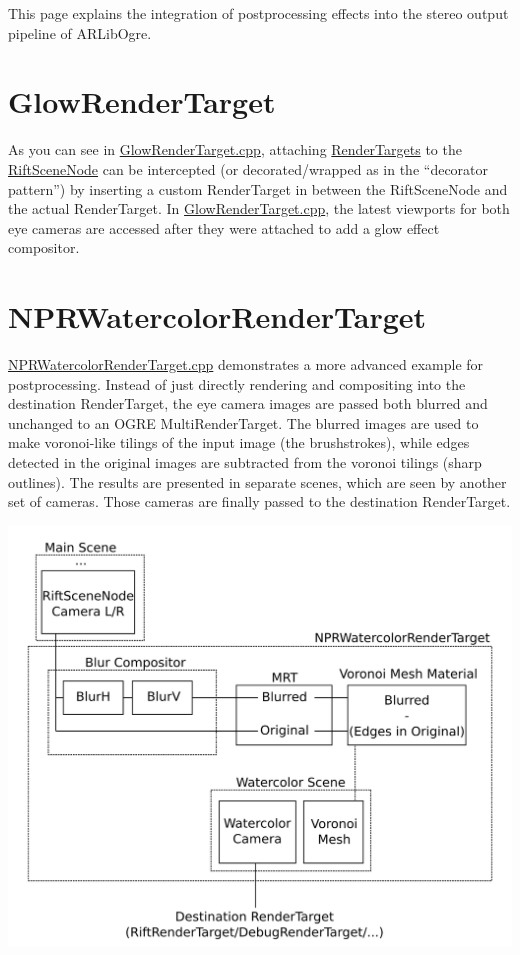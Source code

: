This page explains the integration of postprocessing effects into the stereo output pipeline of ARLibOgre.

\section{GlowRenderTarget}\label{glowrendertarget}

As you can see in
\href{https://github.com/ands/OculusMeetsAR/blob/master/ARLib_Samples/RemoteGame/src/GlowRenderTarget.cpp}{GlowRenderTarget.cpp},
attaching
\hyperref[sec:ogre_library]{RenderTargets}
to the
\href{https://github.com/ands/OculusMeetsAR/blob/master/ARLib/include/ARLib/Ogre/RiftSceneNode.h}{RiftSceneNode}
can be intercepted (or decorated/wrapped as in the ``decorator
pattern'') by inserting a custom RenderTarget in between the
RiftSceneNode and the actual RenderTarget. In
\href{https://github.com/ands/OculusMeetsAR/blob/master/ARLib_Samples/RemoteGame/src/GlowRenderTarget.cpp}{GlowRenderTarget.cpp},
the latest viewports for both eye cameras are accessed after they were
attached to add a glow effect compositor.

\section{NPRWatercolorRenderTarget}\label{nprwatercolorrendertarget}

\href{https://github.com/ands/OculusMeetsAR/blob/master/ARLib_Samples/Common/src/NPRWatercolorRenderTarget.cpp}{NPRWatercolorRenderTarget.cpp}
demonstrates a more advanced example for postprocessing. Instead of just
directly rendering and compositing into the destination RenderTarget,
the eye camera images are passed both blurred and unchanged to an OGRE
MultiRenderTarget. The blurred images are used to make voronoi-like
tilings of the input image (the brushstrokes), while edges detected in
the original images are subtracted from the voronoi tilings (sharp
outlines). The results are presented in separate scenes, which are seen
by another set of cameras. Those cameras are finally passed to the
destination RenderTarget.

\includegraphics*[width=.92\textwidth]{NPRWatercolorRenderTarget.png}

